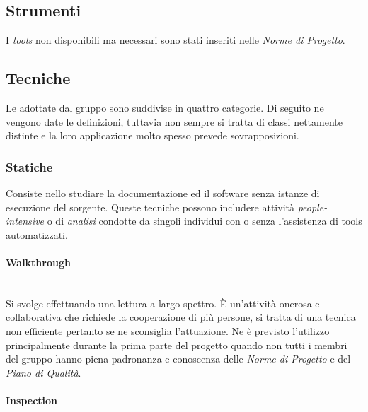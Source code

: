 	\subsection{Strumenti}
		I \emph{tools} non disponibili ma necessari sono stati inseriti nelle \emph{Norme di Progetto}. %
\fi

	\subsection{Tecniche}

	Le  adottate dal gruppo sono suddivise in quattro categorie. Di seguito ne vengono date le definizioni, tuttavia non sempre si tratta di classi nettamente distinte e la loro applicazione molto spesso prevede sovrapposizioni.
	
		\subsubsection{Statiche}

		Consiste nello studiare la documentazione ed il software senza istanze di esecuzione del sorgente. Queste tecniche possono includere attività \emph{people-intensive} o di \emph{analisi} condotte da singoli individui con o senza l'assistenza di tools automatizzati.

			\paragraph{Walkthrough} \mbox{} \\
			
			Si svolge effettuando una lettura a largo spettro. È un'attività onerosa e collaborativa che richiede la cooperazione di più persone, si tratta di una tecnica non efficiente pertanto se ne sconsiglia l'attuazione. Ne è previsto l'utilizzo principalmente durante la prima parte del progetto quando non tutti i membri del gruppo hanno piena padronanza e conoscenza delle \emph{Norme di Progetto} e del \emph{Piano di Qualità}.

			\paragraph{Inspection} \mbox{} \\
			\label{anomaliefrequenti}

